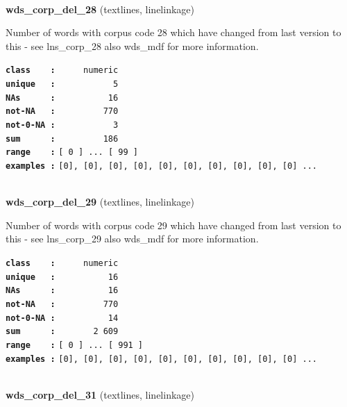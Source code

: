 \documentclass[]{article}
\begin{document}
~

\textbf{wds\_corp\_del\_28} (textlines, linelinkage)

Number of words with corpus code 28 which have changed from last version
to this - see lns\_corp\_28 also wds\_mdf for more information.

\textbf{\texttt{class\ \ \ \ :}} \texttt{~~~~~numeric}\\
\textbf{\texttt{unique\ \ \ :}} \texttt{~~~~~~~~~~~5}\\
\textbf{\texttt{NAs\ \ \ \ \ \ :}} \texttt{~~~~~~~~~~16}\\
\textbf{\texttt{not-NA\ \ \ :}} \texttt{~~~~~~~~~770}\\
\textbf{\texttt{not-0-NA\ :}} \texttt{~~~~~~~~~~~3}\\
\textbf{\texttt{sum\ \ \ \ \ \ :}} \texttt{~~~~~~~~~186}\\
\textbf{\texttt{range\ \ \ \ :}}
\texttt{{[}\ 0\ {]}\ ...\ {[}\ 99\ {]}}\\
\textbf{\texttt{examples\ :}}
\texttt{{[}0{]},\ {[}0{]},\ {[}0{]},\ {[}0{]},\ {[}0{]},\ {[}0{]},\ {[}0{]},\ {[}0{]},\ {[}0{]},\ {[}0{]}\ ...}\\

~

\textbf{wds\_corp\_del\_29} (textlines, linelinkage)

Number of words with corpus code 29 which have changed from last version
to this - see lns\_corp\_29 also wds\_mdf for more information.

\textbf{\texttt{class\ \ \ \ :}} \texttt{~~~~~numeric}\\
\textbf{\texttt{unique\ \ \ :}} \texttt{~~~~~~~~~~16}\\
\textbf{\texttt{NAs\ \ \ \ \ \ :}} \texttt{~~~~~~~~~~16}\\
\textbf{\texttt{not-NA\ \ \ :}} \texttt{~~~~~~~~~770}\\
\textbf{\texttt{not-0-NA\ :}} \texttt{~~~~~~~~~~14}\\
\textbf{\texttt{sum\ \ \ \ \ \ :}} \texttt{~~~~~~~2~609}\\
\textbf{\texttt{range\ \ \ \ :}}
\texttt{{[}\ 0\ {]}\ ...\ {[}\ 991\ {]}}\\
\textbf{\texttt{examples\ :}}
\texttt{{[}0{]},\ {[}0{]},\ {[}0{]},\ {[}0{]},\ {[}0{]},\ {[}0{]},\ {[}0{]},\ {[}0{]},\ {[}0{]},\ {[}0{]}\ ...}\\

~

\textbf{wds\_corp\_del\_31} (textlines, linelinkage)
\end{document}
